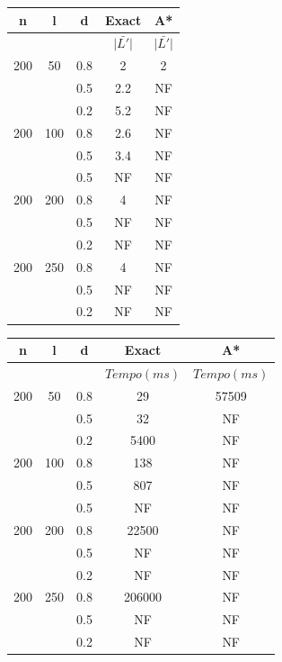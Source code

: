 \documentclass[12pt]{article}
\begin{document}
		
		\vspace{2cm}

		\begin{tabular}{c|c|c|c|c} \hline
			n & l & d & Exact & A* \\ \hline
			& & & $\bar{|L'|}$ & $\bar{|L'|}$ \\ \hline
			200 & 50  & 0.8 & 2 & 2\\
			   &      & 0.5 & 2.2 & NF\\
			   &      & 0.2 & 5.2 & NF\\ \hline
			200 & 100  & 0.8 & 2.6 & NF \\
			   &      & 0.5 & 3.4 & NF\\
			   &      & 0.5 & NF & NF\\ \hline
			200 & 200 & 0.8 &  4 & NF\\
			   &      & 0.5 & NF & NF\\
			   &      & 0.2 & NF & NF\\ \hline
			200 & 250 & 0.8 & 4 & NF\\
			   &      & 0.5 & NF & NF\\
			   &      & 0.2 & NF & NF\\ \hline
		\end{tabular}


		\vspace{2cm}

		\begin{tabular}{c|c|c|c|c} \hline
			n & l & d & Exact & A* \\ \hline
			& & & $Tempo(ms)$ & $Tempo(ms)$\\ \hline
			200 & 50  & 0.8 & 29 & 57509\\
			   &      & 0.5 & 32 & NF\\
			   &      & 0.2 & 5400 & NF\\ \hline
			200 & 100  & 0.8 & 138 & NF \\
			   &      & 0.5 & 807 & NF\\
			   &      & 0.5 & NF & NF\\ \hline
			200 & 200 & 0.8 &  22500 & NF\\
			   &      & 0.5 & NF & NF\\
			   &      & 0.2 & NF & NF\\ \hline
			200 & 250 & 0.8 & 206000 & NF\\
			   &      & 0.5 & NF & NF\\
			   &      & 0.2 & NF & NF\\ \hline
		\end{tabular}
\end{document}
